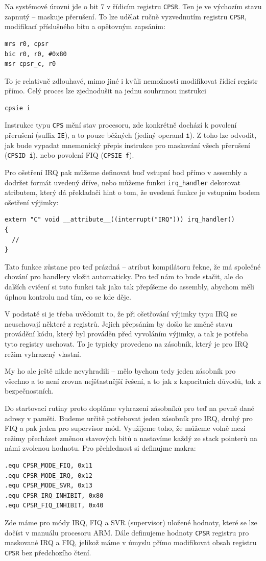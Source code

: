 \documentclass{article}
\begin{document}
Na systémové úrovni jde o bit 7 v řídicím registru \texttt{CPSR}. Ten je ve výchozím stavu zapnutý -- maskuje přerušení. To lze udělat ručně vyzvednutím registru \texttt{CPSR}, modifikací příslušného bitu a opětovným zapsáním:
\begin{lstlisting}
mrs r0, cpsr
bic r0, r0, #0x80
msr cpsr_c, r0
\end{lstlisting}
To je relativně zdlouhavé, mimo jiné i kvůli nemožnosti modifikovat řídicí registr přímo. Celý proces lze zjednodušit na jednu souhrnnou instrukci
\begin{lstlisting}
cpsie i
\end{lstlisting}
Instrukce typu \texttt{CPS} mění stav procesoru, zde konkrétně dochází k povolení přerušení (suffix \texttt{IE}), a to pouze běžných (jediný operand \texttt{i}). Z toho lze odvodit, jak bude vypadat mnemonický přepis instrukce pro maskování všech přerušení (\texttt{CPSID i}), nebo povolení FIQ (\texttt{CPSIE f}).

Pro ošetření IRQ pak můžeme definovat buď vstupní bod přímo v assembly a dodržet formát uvedený dříve, nebo můžeme funkci \texttt{irq\_handler} dekorovat atributem, který dá překladači hint o tom, že uvedená funkce je vstupním bodem ošetření výjimky:
\begin{lstlisting}
extern "C" void __attribute__((interrupt("IRQ"))) irq_handler()
{
  //
}
\end{lstlisting}
Tato funkce zůstane pro teď prázdná -- atribut kompilátoru řekne, že má společné chování pro handlery vložit automaticky. Pro teď nám to bude stačit, ale do dalších cvičení si tuto funkci tak jako tak přepíšeme do assembly, abychom měli úplnou kontrolu nad tím, co se kde děje.

V podstatě si je třeba uvědomit to, že při ošetřování výjimky typu IRQ se neuschovají některé z registrů. Jejich přepsáním by došlo ke změně stavu provádění kódu, který byl prováděn před vyvoláním výjimky, a tak je potřeba tyto registry uschovat. To je typicky provedeno na zásobník, který je pro IRQ režim vyhrazený vlastní.

My ho ale ještě nikde nevyhradili -- mělo bychom tedy jeden zásobník pro všechno a to není zrovna nejšťastnější řešení, a to jak z kapacitních důvodů, tak z bezpečnostních.

Do startovací rutiny proto doplňme vyhrazení zásobníků pro teď na pevně dané adresy v paměti. Budeme určitě potřebovat jeden zásobník pro IRQ, druhý pro FIQ a pak jeden pro supervisor mód. Využijeme toho, že můžeme volně mezi režimy přecházet změnou stavových bitů a nastavíme každý ze stack pointerů na námi zvolenou hodnotu. Pro přehlednost si definujme makra:
\begin{lstlisting}
.equ CPSR_MODE_FIQ, 0x11
.equ CPSR_MODE_IRQ, 0x12
.equ CPSR_MODE_SVR, 0x13
.equ CPSR_IRQ_INHIBIT, 0x80
.equ CPSR_FIQ_INHIBIT, 0x40
\end{lstlisting}
Zde máme pro módy IRQ, FIQ a SVR (supervisor) uložené hodnoty, které se lze dočíst v manuálu procesoru ARM. Dále definujeme hodnoty \texttt{CPSR} registru pro maskované IRQ a FIQ, jelikož máme v úmyslu přímo modifikovat obsah registru \texttt{CPSR} bez předchozího čtení.
\end{document}
